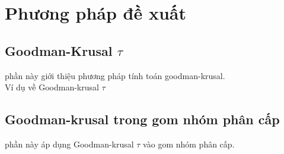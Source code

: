 \chapter{Phương pháp đề xuất}
\label{Chapter3}

\section{Goodman-Krusal $\tau$}
\hspace{10mm}phần này giới thiệu phương pháp tính toán goodman-krusal.\\
\hspace*{10mm}Ví dụ về Goodman-krusal $\tau$\\

\section{Goodman-krusal trong gom nhóm phân cấp}
\hspace{10mm}phần này áp dụng Goodman-krusal $\tau$ vào gom nhóm phân cấp.\\

